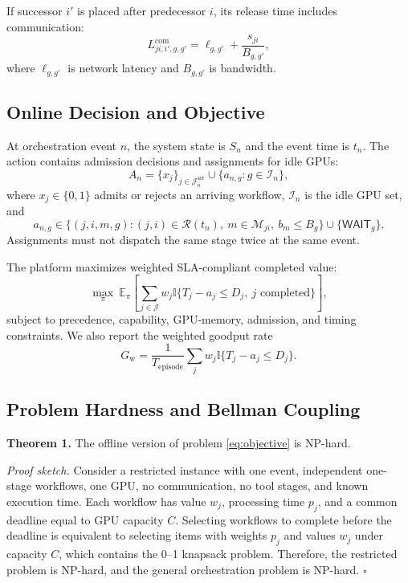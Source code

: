\documentclass[10pt,conference]{IEEEtran}
\newcommand{\calJ}{\mathcal{J}}
\newcommand{\calI}{\mathcal{I}}
\newcommand{\calM}{\mathcal{M}}
\newcommand{\calR}{\mathcal{R}}
\newcommand{\ind}{\mathbb{I}}
\begin{document}
If successor \(i'\) is placed after predecessor \(i\), its release time includes communication:
\begin{equation}
L^{\mathrm{com}}_{ji,i',g,g'}=\ell_{g,g'} + \frac{s_{ji}}{B_{g,g'}},
\end{equation}
where \(\ell_{g,g'}\) is network latency and \(B_{g,g'}\) is bandwidth.

\subsection{Online Decision and Objective}

At orchestration event \(n\), the system state is \(S_n\) and the event time is \(t_n\). The action contains admission decisions and assignments for idle GPUs:
\begin{equation}
A_n=\{x_j\}_{j\in\calJ_n^{\mathrm{arr}}}\cup \{a_{n,g}:g\in\calI_n\},
\end{equation}
where \(x_j\in\{0,1\}\) admits or rejects an arriving workflow, \(\calI_n\) is the idle GPU set, and
\begin{equation}
a_{n,g}\in \{(j,i,m,g):(j,i)\in\calR(t_n),~m\in\calM_{ji},~b_m\le B_g\}\cup\{\textsf{WAIT}_g\}.
\end{equation}
Assignments must not dispatch the same stage twice at the same event.

The platform maximizes weighted SLA-compliant completed value:
\begin{equation}
\max_{\pi}~\mathbb{E}_{\pi}\left[\sum_{j\in\calJ} w_j
\ind\{T_j-a_j\le D_j,~j\text{ completed}\}\right],
\label{eq:objective}
\end{equation}
subject to precedence, capability, GPU-memory, admission, and timing constraints. We also report the weighted goodput rate
\begin{equation}
G_{\mathrm{w}}=\frac{1}{T_{\mathrm{episode}}}
\sum_j w_j\ind\{T_j-a_j\le D_j\}.
\end{equation}

\subsection{Problem Hardness and Bellman Coupling}

\textbf{Theorem 1.} The offline version of problem \eqref{eq:objective} is NP-hard.

\textit{Proof sketch.} Consider a restricted instance with one event, independent one-stage workflows, one GPU, no communication, no tool stages, and known execution time. Each workflow has value \(w_j\), processing time \(p_j\), and a common deadline equal to GPU capacity \(C\). Selecting workflows to complete before the deadline is equivalent to selecting items with weights \(p_j\) and values \(w_j\) under capacity \(C\), which contains the 0--1 knapsack problem. Therefore, the restricted problem is NP-hard, and the general orchestration problem is NP-hard. \(\square\)
\end{document}
